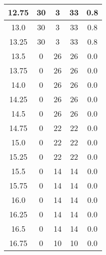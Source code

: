 \documentclass[letterpaper, 12pt]{article}
\begin{document}
\begin{longtable}{|c|c|c|c|c|}
\hline
12.75 & 30 & 3 & 33 & 0.8 \\
\hline
13.0 & 30 & 3 & 33 & 0.8 \\
\hline
13.25 & 30 & 3 & 33 & 0.8 \\
\hline
13.5 & 0 & 26 & 26 & 0.0 \\
\hline
13.75 & 0 & 26 & 26 & 0.0 \\
\hline
14.0 & 0 & 26 & 26 & 0.0 \\
\hline
14.25 & 0 & 26 & 26 & 0.0 \\
\hline
14.5 & 0 & 26 & 26 & 0.0 \\
\hline
14.75 & 0 & 22 & 22 & 0.0 \\
\hline
15.0 & 0 & 22 & 22 & 0.0 \\
\hline
15.25 & 0 & 22 & 22 & 0.0 \\
\hline
15.5 & 0 & 14 & 14 & 0.0 \\
\hline
15.75 & 0 & 14 & 14 & 0.0 \\
\hline
16.0 & 0 & 14 & 14 & 0.0 \\
\hline
16.25 & 0 & 14 & 14 & 0.0 \\
\hline
16.5 & 0 & 14 & 14 & 0.0 \\
\hline
16.75 & 0 & 10 & 10 & 0.0 \\
\hline
\end{longtable}
\end{document}
